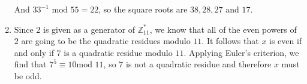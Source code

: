 \begin{enumerate}
And $33^{-1} \textrm{ mod } 55 = 22$, so the square roots are $38, 28, 27$ and
$17$.

\item Since $2$ is given as a generator of $\mathbb{Z}_{11}^{*}$, we know that
all of the even powers of $2$ are going to be the quadratic residues modulo
$11$. It follows that $x$ is even if and only if $7$ is a quadratic residue
modulo $11$. Applying Euler's criterion, we find that $7^5 \equiv 10 \textrm{
mod } 11$, so $7$ is not a quadratic residue and therefore $x$ must be odd.

\end{enumerate}
